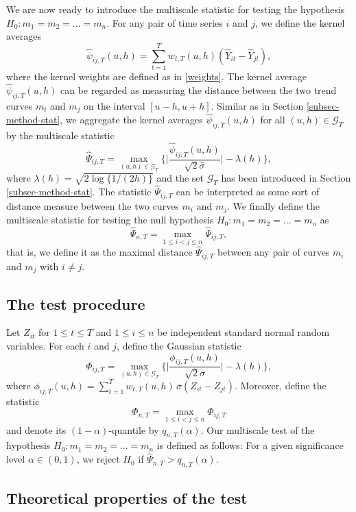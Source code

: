 We are now ready to introduce the multiscale statistic for testing the hypothesis $H_0: m_1 = m_2 = \ldots = m_n$. For any pair of time series $i$ and $j$, we define the kernel averages
\[ \widehat{\psi}_{ij,T}(u,h) = \sum\limits_{t=1}^T w_{t,T}(u,h)(\widehat{Y}_{it} - \widehat{Y}_{jt}), \]
where the kernel weights are defined as in \eqref{weights}. The kernel average $\widehat{\psi}_{ij,T}(u,h)$ can be regarded as measuring the distance between the two trend curves $m_i$ and $m_j$ on the interval $[u-h,u+h]$. Similar as in Section \ref{subsec-method-stat}, we aggregate the kernel averages $\widehat{\psi}_{ij,T}(u,h)$ for all $(u,h) \in \mathcal{G}_T$ by the multiscale statistic 
\[ \widehat{\Psi}_{ij,T} = \max_{(u,h) \in \mathcal{G}_T} \Big\{ \Big|\frac{\widehat{\psi}_{ij,T}(u,h)}{\sqrt{2} \widehat{\sigma}}\Big| - \lambda(h) \Big\}, \] 
where $\lambda(h) = \sqrt{2 \log \{ 1/(2h) \}}$ and the set $\mathcal{G}_T$ has been introduced in Section \ref{subsec-method-stat}. The statistic $\widehat{\Psi}_{ij,T}$ can be interpreted as some sort of distance measure between the two curves $m_i$ and $m_j$. We finally define the multiscale statistic for testing the null hypothesis $H_0: m_1 =m_2 = \ldots = m_n$ as
\[ \widehat{\Psi}_{n,T} = \max_{1 \le i < j \le n} \widehat{\Psi}_{ij,T}, \]
that is, we define it as the maximal distance $\widehat{\Psi}_{ij,T}$ between any pair of curves $m_i$ and $m_j$ with $i \ne j$. 


\subsection{The test procedure}\label{subsec-test-equality-test}


Let $Z_{it}$ for $1 \le t \le T$ and $1 \le i \le n$ be independent standard normal random variables. For each $i$ and $j$, define the Gaussian statistic 
\[ \Phi_{ij,T} = \max_{(u,h) \in \mathcal{G}_T} \Big\{ \Big|\frac{\phi_{ij,T}(u,h)}{\sqrt{2} \sigma}\Big| - \lambda(h) \Big\}, \] 
where $\phi_{ij,T}(u,h) = \sum\nolimits_{t=1}^T w_{t,T}(u,h) \, \sigma (Z_{it} - Z_{jt})$. Moreover, define the statistic
\[ \Phi_{n,T} = \max_{1 \le i < j \le n} \Phi_{ij,T} \]
and denote its $(1-\alpha)$-quantile by $q_{n,T}(\alpha)$. Our multiscale test of the hypothesis $H_0: m_1 = m_2 = \ldots = m_n$ is defined as follows: For a given significance level $\alpha \in (0,1)$, we reject $H_0$ if $\widehat{\Psi}_{n,T} > q_{n,T}(\alpha)$. 


\subsection{Theoretical properties of the test}\label{subsec-test-equality-theo}


